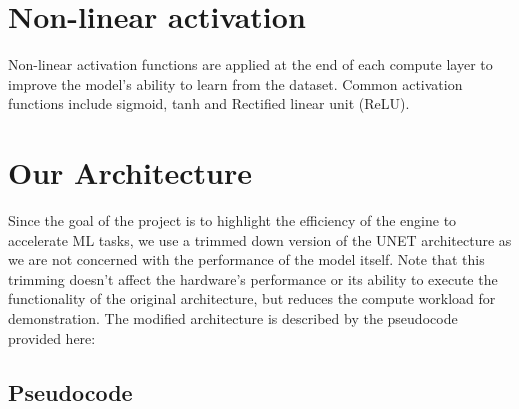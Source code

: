 \documentclass[a4paper,12pt, final]{report}
\begin{document}
\section{Non-linear activation}

Non-linear activation functions are applied at the end of each compute layer to improve the model's ability to learn from the dataset. Common activation functions include sigmoid, tanh and Rectified linear unit (ReLU).

\section{Our Architecture}

Since the goal of the project is to highlight the efficiency of the engine to accelerate ML tasks, we use a trimmed down version of the UNET architecture \cite{UNET} as we are not concerned with the performance of the model itself. Note that this trimming doesn't affect the hardware's performance or its ability to execute the functionality of the original architecture, but reduces the compute workload for demonstration. The modified architecture is described by the pseudocode provided here:

\subsection{Pseudocode}\label{pseudocode}
\end{document}
